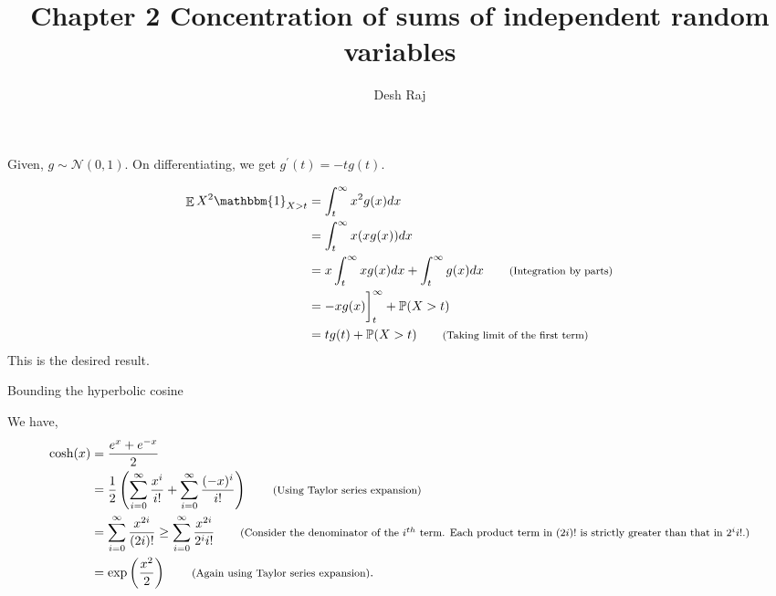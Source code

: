 \documentclass[11pt]{article}
\newenvironment{exercise}[2][Exercise]{\begin{trivlist}
\item[\hskip \labelsep {\bfseries #1}\hskip \labelsep {\bfseries #2.}]}{\end{trivlist}}
\newenvironment{solution}[1][Solution]{\begin{trivlist}
\item[\hskip \labelsep {\bfseries #1}\hskip \labelsep]}{\end{trivlist}}
\DeclareMathOperator*{\E}{\mathbb{E}}
\newcommand*{\annot}[1]{\tag*{\footnotesize{(#1)}}}
\begin{document}
 
 
\title{Chapter 2 Concentration of sums of independent random variables}
\author{Desh Raj} 
 
\maketitle
 
\begin{exercise}{2.1.4}
\end{exercise}
 
\begin{solution}
Given, $g \sim \mathcal{N}(0,1)$. On differentiating, we get $g^{\prime}(t) = -t g(t)$. 

\begin{align*}
\E X^2 \mathbbm{1}_{X>t} &= \int_t^{\infty} x^2 g(x) dx \\
						&= \int_t^{\infty} x (xg(x)) dx \\
						&= x\int_t^{\infty} x g(x) dx + \int_t^{\infty} g(x)dx  \annot{Integration by parts}\\
						&= -xg(x)\bigg]_t^{\infty} + \mathbb{P}(X>t) \\
						&= tg(t) + \mathbb{P}(X>t) \annot{Taking limit of the first term}
\end{align*}
This is the desired result.
\end{solution}

\begin{exercise}{2.2.3}Bounding the hyperbolic cosine
\end{exercise}

\begin{solution}
We have,
\begin{align*}
\text{cosh}(x) &= \frac{e^x + e^{-x}}{2} \\
			&= \frac{1}{2}\left( \sum_{i=0}^{\infty}\frac{x^i}{i!} + \sum_{i=0}^{\infty}\frac{(-x)^i}{i!} \right) \annot{Using Taylor series expansion} \\
			&= \sum_{i=0}^{\infty}\frac{x^{2i}}{(2i)!}
			\geq \sum_{i=0}^{\infty}\frac{x^{2i}}{2^i i!} \annot{Consider the denominator of the $i^{th}$ term. Each product term in $(2i)!$ is strictly greater than that in $2^i i!$.}\\
			&= \exp\left(\frac{x^2}{2}\right) \annot{Again using Taylor series expansion}.
\end{align*}
\end{solution}
\end{document}
